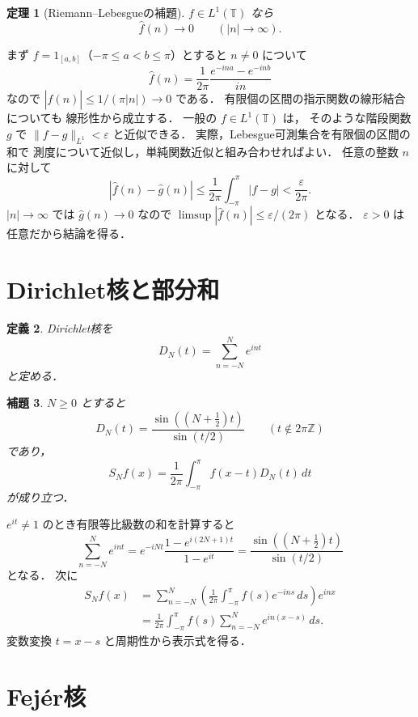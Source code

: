 \documentclass[a5paper,10pt,onecolumn]{jsarticle}
\makeatletter
\theoremstyle{mathnotetheorem}
\newtheorem{theorem}{定理}[section]
\newtheorem{definition}[theorem]{定義}
\newtheorem{lemma}[theorem]{補題}
\renewcommand{\proofname}{証明}
\renewenvironment{proof}[1][\proofname]{%
  \par\pushQED{\qed}\normalfont\topsep4\p@\@plus2\p@\relax
  \trivlist\item[\hskip\labelsep\bfseries #1]\ignorespaces
}{\popQED\endtrivlist\@endpefalse}
\newcommand{\norm}[1]{\lVert #1\rVert}
\makeatother
\begin{document}
\begin{theorem}[Riemann--Lebesgueの補題]\label{thm:rl}
$f\in L^1(\mathbb T)$ なら
\[
 \widehat f(n)\longrightarrow0
 \qquad(|n|\to\infty).
\]
\end{theorem}
\begin{proof}
まず $f=1_{[a,b]}$（$-\pi\le a<b\le\pi$）とすると
$n\ne0$ について
\[
 \widehat f(n)
 =\frac1{2\pi}\frac{e^{-ina}-e^{-inb}}{in}
\]
なので $|\widehat f(n)|\le1/(\pi|n|)\to0$ である．
有限個の区間の指示関数の線形結合についても
線形性から成立する．
一般の $f\in L^1(\mathbb T)$ は，
そのような階段関数 $g$ で
$\norm{f-g}_{L^1}<\varepsilon$ と近似できる．
実際，Lebesgue可測集合を有限個の区間の和で
測度について近似し，単純関数近似と組み合わせればよい．
任意の整数 $n$ に対して
\[
 |\widehat f(n)-\widehat g(n)|
 \le\frac1{2\pi}\int_{-\pi}^\pi|f-g|
 <\frac{\varepsilon}{2\pi}.
\]
$|n|\to\infty$ では $\widehat g(n)\to0$ なので
$\limsup|\widehat f(n)|\le\varepsilon/(2\pi)$ となる．
$\varepsilon>0$ は任意だから結論を得る．
\end{proof}

\section{Dirichlet核と部分和}

\begin{definition}
Dirichlet核を
\[
 D_N(t)=\sum_{n=-N}^Ne^{int}
\]
と定める．
\end{definition}

\begin{lemma}\label{lem:dirichlet-kernel}
$N\ge0$ とすると
\[
 D_N(t)=\frac{\sin((N+\tfrac12)t)}{\sin(t/2)}
 \qquad(t\notin2\pi\mathbb Z)
\]
であり，
\[
 S_Nf(x)=\frac1{2\pi}\int_{-\pi}^\pi f(x-t)D_N(t)\,dt
\]
が成り立つ．
\end{lemma}
\begin{proof}
$e^{it}\ne1$ のとき有限等比級数の和を計算すると
\[
 \sum_{n=-N}^Ne^{int}
 =e^{-iNt}\frac{1-e^{i(2N+1)t}}{1-e^{it}}
 =\frac{\sin((N+\frac12)t)}{\sin(t/2)}
\]
となる．
次に
\begin{align*}
 S_Nf(x)
 &=\sum_{n=-N}^N
   \left(\frac1{2\pi}\int_{-\pi}^\pi
   f(s)e^{-ins}\,ds\right)e^{inx}\\
 &=\frac1{2\pi}\int_{-\pi}^\pi
   f(s)\sum_{n=-N}^Ne^{in(x-s)}\,ds.
\end{align*}
変数変換 $t=x-s$ と周期性から表示式を得る．
\end{proof}

\section{Fej\'er核}
\end{document}
